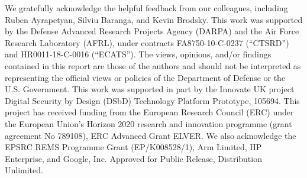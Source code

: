 \documentclass[12pt,twoside,openright,a4paper]{article}
\begin{document}
We gratefully acknowledge the helpful feedback from our colleagues, including
Ruben Ayrapetyan, Silviu Baranga, and Kevin Brodsky.
This work was supported by the Defense Advanced Research Projects Agency (DARPA) and the Air Force Research Laboratory (AFRL), under contracts
FA8750-10-C-0237 (``CTSRD'') and HR0011-18-C-0016 (``ECATS'').
The views, opinions, and/or findings contained in this report are those of the authors and should not be interpreted as representing the official views or policies of the Department of Defense or the U.S. Government.
This work was supported in part by the Innovate UK project Digital Security by
Design (DSbD) Technology Platform Prototype, 105694.
This project has received funding from the European Research Council
(ERC) under the European Union's Horizon 2020 research and innovation programme (grant agreement No 789108), ERC Advanced Grant ELVER.
We also acknowledge the EPSRC REMS Programme Grant (EP/K008528/1), Arm Limited,
HP Enterprise, and Google, Inc.
Approved for Public Release, Distribution Unlimited.

\printbibliography
\end{document}
